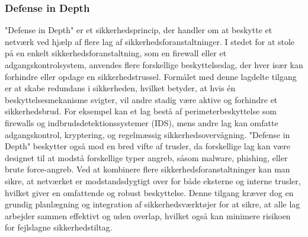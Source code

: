 \subsubsection{Defense in Depth}
"Defense in Depth" er et sikkerhedsprincip, der handler om at beskytte et netværk ved hjælp af flere lag af sikkerhedsforanstaltninger. I stedet for at stole på en enkelt sikkerhedsforanstaltning, som en firewall eller et adgangskontrolsystem, anvendes flere forskellige beskyttelseslag, der hver især kan forhindre eller opdage en sikkerhedstrussel.
\newline\newline\noindent
Formålet med denne lagdelte tilgang er at skabe redundans i sikkerheden, hvilket betyder, at hvis én beskyttelsesmekanisme svigter, vil andre stadig være aktive og forhindre et sikkerhedsbrud. For eksempel kan et lag bestå af perimeterbeskyttelse som firewalls og indbrudsdetektionssystemer (IDS), mens andre lag kan omfatte adgangskontrol, kryptering, og regelmæssig sikkerhedsovervågning.
\newline\newline\noindent
"Defense in Depth" beskytter også mod en bred vifte af trusler, da forskellige lag kan være designet til at modstå forskellige typer angreb, såsom malware, phishing, eller brute force-angreb. Ved at kombinere flere sikkerhedsforanstaltninger kan man sikre, at netværket er modstandsdygtigt over for både eksterne og interne trusler, hvilket giver en omfattende og robust beskyttelse.
\newline\newline\noindent
Denne tilgang kræver dog en grundig planlægning og integration af sikkerhedsværktøjer for at sikre, at alle lag arbejder sammen effektivt og uden overlap, hvilket også kan minimere risikoen for fejlslagne sikkerhedstiltag.


